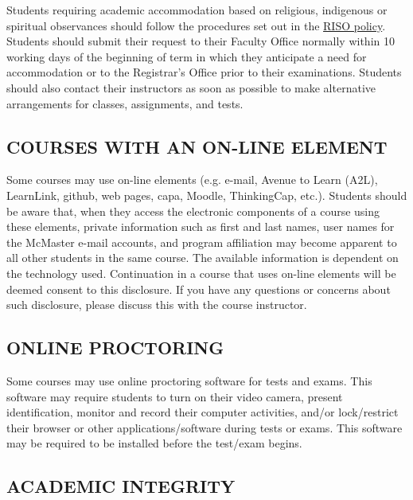 \documentclass[12pt]{article}
\begin{document}
Students requiring academic accommodation based on religious,
indigenous or spiritual observances should follow the procedures set
out in the
\href{https://secretariat.mcmaster.ca/app/uploads/2019/02/Academic-Accommodation-for-Religious-Indigenous-and-Spiritual-Observances-Policy-on.pdf}{RISO
  policy}. Students should submit their request to their Faculty
Office normally within 10 working days of the beginning of term in
which they anticipate a need for accommodation or to the Registrar's
Office prior to their examinations. Students should also contact their
instructors as soon as possible to make alternative arrangements for
classes, assignments, and tests.

\subsection*{COURSES WITH AN ON-LINE ELEMENT}

Some courses may use on-line elements (e.g. e-mail, Avenue to Learn
(A2L), LearnLink, github, web pages, capa, Moodle, ThinkingCap,
etc.). Students should be aware that, when they access the electronic
components of a course using these elements, private information such
as first and last names, user names for the McMaster e-mail accounts,
and program affiliation may become apparent to all other students in
the same course. The available information is dependent on the
technology used. Continuation in a course that uses on-line elements
will be deemed consent to this disclosure.  If you have any questions
or concerns about such disclosure, please discuss this with the course
instructor.

\subsection*{ONLINE PROCTORING}

Some courses may use online proctoring software for tests and
exams. This software may require students to turn on their video
camera, present identification, monitor and record their computer
activities, and/or lock/restrict their browser or other
applications/software during tests or exams. This software may be
required to be installed before the test/exam begins.

\subsection*{ACADEMIC INTEGRITY}
\end{document}
